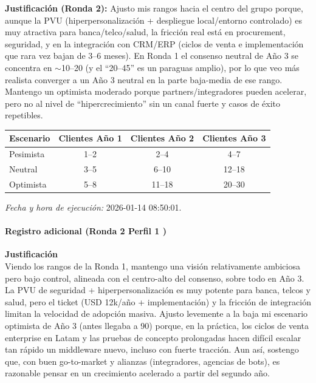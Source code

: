 \textbf{Justificación (Ronda 2):} Ajusto mis rangos hacia el centro del grupo porque, aunque la PVU (hiperpersonalización + despliegue local/entorno controlado) es muy atractiva para banca/telco/salud, la fricción real está en procurement, seguridad, y en la integración con CRM/ERP (ciclos de venta e implementación que rara vez bajan de 3–6 meses). En Ronda 1 el consenso neutral de Año 3 se concentra en \mbox{$\sim$10–20} (y el ``20–45'' es un paraguas amplio), por lo que veo más realista converger a un Año 3 neutral en la parte baja-media de ese rango. Mantengo un optimista moderado porque partners/integradores pueden acelerar, pero no al nivel de ``hipercrecimiento'' sin un canal fuerte y casos de éxito repetibles.

\begin{center}
\footnotesize
\begin{tabular}{|l|c|c|c|}
\hline
\textbf{Escenario} & \textbf{Clientes Año 1} & \textbf{Clientes Año 2} & \textbf{Clientes Año 3} \\
\hline
Pesimista & 1--2 & 2--4 & 4--7 \\
\hline
Neutral & 3--5 & 6--10 & 12--18 \\
\hline
Optimista & 5--8 & 11--18 & 20--30 \\
\hline
\end{tabular}
\end{center}

\textit{Fecha y hora de ejecución:} 2026-01-14 08:50:01.

\paragraph{Registro adicional (Ronda 2 Perfil 1 )}

\textbf{Justificación  }\\
Viendo los rangos de la Ronda 1, mantengo una visión relativamente ambiciosa pero bajo control, alineada con el centro-alto del consenso, sobre todo en Año 3. La PVU de seguridad + hiperpersonalización es muy potente para banca, telcos y salud, pero el ticket (USD 12k/año + implementación) y la fricción de integración limitan la velocidad de adopción masiva. Ajusto levemente a la baja mi escenario optimista de Año 3 (antes llegaba a 90) porque, en la práctica, los ciclos de venta enterprise en Latam y las pruebas de concepto prolongadas hacen difícil escalar tan rápido un middleware nuevo, incluso con fuerte tracción. Aun así, sostengo que, con buen go-to-market y alianzas (integradores, agencias de bots), es razonable pensar en un crecimiento acelerado a partir del segundo año.

